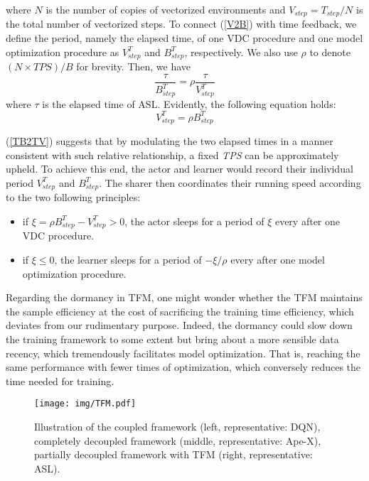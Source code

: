 \documentclass[journal]{IEEEtran}
\begin{document}
\noindent where $N$ is the number of copies of vectorized environments and $V_{step} = T_{step}/N$ is the total number of vectorized steps. To connect (\ref{V2B}) with time feedback, we define the period, namely the elapsed time, of one VDC procedure and one model optimization procedure as $V_{step}^{T}$ and $B_{step}^{T}$, respectively. We also use $\rho$ to denote $(N \times TPS)/B$ for brevity. Then, we have
\begin{equation}
	\label{Times2Period}
	\frac{\tau}{B_{step}^{T}}  = \rho \frac{\tau}{V_{step}^{T}}
\end{equation}
\noindent where $\tau$ is the elapsed time of ASL. Evidently, the following equation holds:
\begin{equation}
	\label{TB2TV}
	V_{step}^{T}  = \rho B_{step}^{T} 
\end{equation}

(\ref{TB2TV}) suggests that by modulating the two elapsed times in a manner consistent with such relative relationship, a fixed \textit{TPS} can be approximately upheld. To achieve this end, the actor and learner would record their individual period $V_{step}^{T}$ and $B_{step}^{T}$. The sharer then coordinates their running speed according to the two following principles:

\begin{itemize}
	\item{if $\xi = \rho B_{step}^{T} - V_{step}^{T} > 0$, the actor sleeps for a period of $\xi$ every after one VDC procedure.}
	
	\item{if $\xi \leq 0 $, the learner sleeps for a period of $ -\xi/{\rho} $ every after one model optimization procedure.}
\end{itemize}

Regarding the dormancy in TFM, one might wonder whether the TFM maintains the sample efficiency at the cost of sacrificing the training time efficiency, which deviates from our rudimentary purpose. Indeed, the dormancy could slow down the training framework to some extent but bring about a more sensible data recency, which tremendously facilitates model optimization. That is, reaching the same performance with fewer times of optimization, which conversely reduces the time needed for training.

\begin{figure}
	\centering
	\texttt{[image: img/TFM.pdf]}
	\caption{Illustration of the coupled framework (left, representative: DQN), completely decoupled framework (middle, representative: Ape-X), partially decoupled framework with TFM (right, representative: ASL).}
	\label{TFM}
\end{figure}
\end{document}
